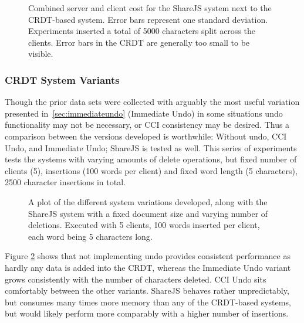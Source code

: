 \documentclass[12pt,a4paper,twoside,openright]{report}
\begin{document}
				\begin{figure}[htb]
					\centering
					
					\caption[Memory Consumption versus Replication] {Combined server and client cost for the ShareJS system next to the CRDT-based system. Error bars represent one standard deviation. Experiments inserted a total of 5000 characters split across the clients. Error bars in the CRDT are generally too small to be visible.}
					\label{fig:memvsreplication}
				\end{figure}
				
			\subsubsection{CRDT System Variants}
				Though the prior data sets were collected with arguably the most useful variation presented in~\cref{sec:immediateundo} (Immediate Undo) in some situations undo functionality may not be necessary, or CCI consistency may be desired. Thus a comparison between the versions developed is worthwhile: Without undo, CCI Undo, and Immediate Undo; ShareJS is tested as well. This series of experiments tests the systems with varying amounts of delete operations, but fixed number of clients (5), insertions (100 words per client) and fixed word length (5 characters), 2500 character insertions in total.
				
				\begin{figure}[htb]
					\centering
					
					\caption[Behavior of System Variants - Memory] {A plot of the different system variations developed, along with the ShareJS system with a fixed document size and varying number of deletions. Executed with 5 clients, 100 words inserted per client, each word being 5 characters long.}
					\label{fig:variantsmemory}
				\end{figure}
				
				Figure \ref{fig:variantsmemory} shows that not implementing undo provides consistent performance as hardly any data is added into the CRDT, whereas the Immediate Undo variant grows consistently with the number of characters deleted. CCI Undo sits comfortably between the other variants. ShareJS behaves rather unpredictably, but consumes many times more memory than any of the CRDT-based systems, but would likely perform more comparably with a higher number of insertions.
				
\end{document}
